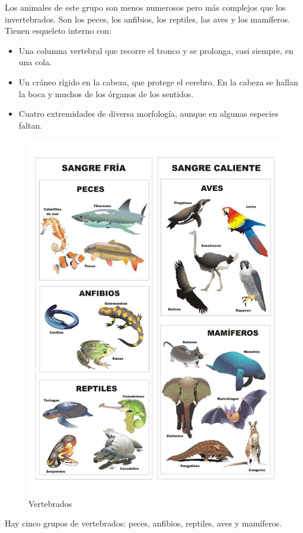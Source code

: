 \vspace{3mm}
Los animales de este grupo son menos numerosos pero más complejos que los invertebrados. Son los peces, los anfibios, los reptiles, las aves y los mamíferos. Tienen esqueleto interno con:
\begin{itemize}
    \item Una columna vertebral que recorre el tronco y se prolonga, casi siempre, en una cola.
    \item Un cráneo rígido en la cabeza, que protege el cerebro. En la cabeza se hallan la boca y muchos de los órganos de los sentidos.
    \item Cuatro extremidades de diversa morfología, aunque en algunas especies faltan.
\end{itemize}
\begin{figure}[!ht]
    \centering
    \includegraphics[width=0.7\linewidth]{Tema1/19_Vertebrados.jpeg}
    \caption{Vertebrados}
    \label{fig:vertebrados}
\end{figure}
Hay cinco grupos de vertebrados: peces, anfibios, reptiles, aves y mamíferos.
